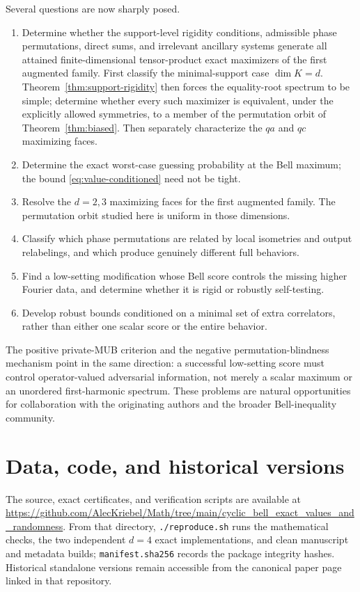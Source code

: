 \documentclass[11pt]{article}
\theoremstyle{definition}
\theoremstyle{remark}
\begin{document}
Several questions are now sharply posed.
\begin{enumerate}[leftmargin=1.6em]
\item Determine whether the support-level rigidity conditions, admissible
phase permutations, direct sums, and irrelevant ancillary systems generate
all attained finite-dimensional tensor-product exact maximizers of the first
augmented family.  First classify the minimal-support case \(\dim K=d\).
Theorem~\ref{thm:support-rigidity} then forces the equality-root spectrum to
be simple; determine whether every such maximizer is equivalent, under the
explicitly allowed symmetries, to a member of the permutation orbit of
Theorem~\ref{thm:biased}.  Then separately characterize the \(qa\) and \(qc\)
maximizing faces.
\item Determine the exact worst-case guessing probability at the Bell maximum;
the bound \eqref{eq:value-conditioned} need not be tight.
\item Resolve the \(d=2,3\) maximizing faces for the first augmented family.
The permutation orbit studied here is uniform in those dimensions.
\item Classify which phase permutations are related by local isometries and
output relabelings, and which produce genuinely different full behaviors.
\item Find a low-setting modification whose Bell score controls the missing
higher Fourier data, and determine whether it is rigid or robustly
self-testing.
\item Develop robust bounds conditioned on a minimal set of extra correlators,
rather than either one scalar score or the entire behavior.
\end{enumerate}
The positive private-MUB criterion and the negative permutation-blindness
mechanism point in the same direction: a successful low-setting score must
control operator-valued adversarial information, not merely a scalar maximum
or an unordered first-harmonic spectrum.
These problems are natural opportunities for collaboration with the
originating authors and the broader Bell-inequality community.

\section*{Data, code, and historical versions}

The source, exact certificates, and verification scripts are available at
\url{https://github.com/AlecKriebel/Math/tree/main/cyclic_bell_exact_values_and_randomness}.
From that directory, \texttt{./reproduce.sh} runs the mathematical checks,
the two independent \(d=4\) exact implementations, and clean manuscript and
metadata builds; \texttt{manifest.sha256} records the package integrity
hashes.  Historical standalone versions remain accessible from the canonical
paper page linked in that repository.
\end{document}
